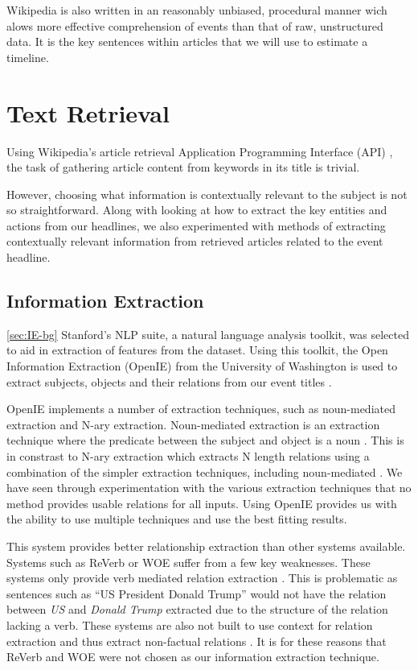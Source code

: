 \documentclass[bsc,frontabs,twoside,singlespacing,parskip,deptreport]{infthesis}     %
\begin{document}
Wikipedia is also written in an reasonably unbiased, procedural manner wich alows more effective comprehension of events
than that of raw, unstructured data.
It is the key sentences within articles that we will use to estimate a timeline.

\section{Text Retrieval}
Using Wikipedia's article retrieval Application Programming Interface (API) \cite{wikipediaAPI}, the task of gathering article content
from keywords in its title is trivial.

However, choosing what information is contextually relevant to the subject is not so straightforward.
Along with looking at how to extract the key entities and actions from our 
headlines, we also experimented with methods of extracting contextually relevant information from
retrieved articles related to the event headline.

\subsection{Information Extraction}\ref{sec:IE-bg}
Stanford's NLP suite,
a natural language analysis toolkit,
was selected to aid in extraction of features from the dataset.
Using this toolkit, the Open Information Extraction (OpenIE) from
the University of Washington is used to extract subjects, objects
and their relations from our event titles \cite{schmitz2012open}.


OpenIE implements a number of extraction techniques, such as noun-mediated extraction and N-ary extraction.
Noun-mediated extraction is an extraction technique where the predicate between the subject and object is a noun \cite{mirrezaei2015triplex}.
This is in constrast to N-ary extraction which extracts N length relations using a combination of the simpler extraction techniques, including noun-mediated \cite{akbik2012kraken}. 
We have seen through experimentation with the various extraction techniques that no  method provides
usable relations for all inputs. Using OpenIE provides us with the ability to use multiple techniques and
use the best fitting results.

This system provides better relationship extraction than other systems available. Systems such as
ReVerb\cite{fader2011identifying} or WOE\cite{wu2010open} suffer from a few key weaknesses. These systems only provide verb mediated relation extraction \cite{schmitz2012open}.
This is problematic as sentences such as ``US President Donald Trump'' would not have the relation between \textit{US} and \textit{Donald Trump} extracted due to the structure of the relation lacking a verb.
These systems are also not built to use context for relation extraction and thus extract non-factual relations \cite{schmitz2012open}.
It is for these reasons that ReVerb and WOE were not chosen as our information extraction technique.
\end{document}
